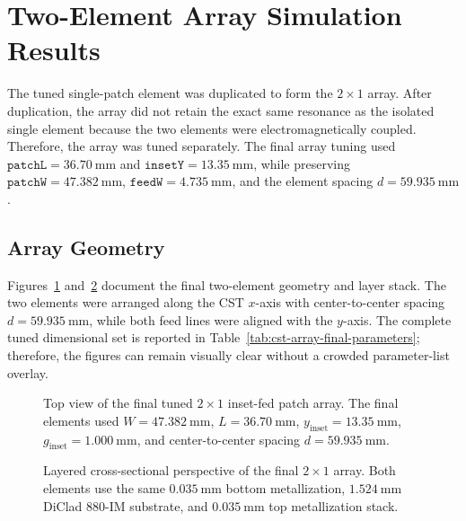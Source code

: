 \section{Two-Element Array Simulation Results}
\label{sec:array-results}

The tuned single-patch element was duplicated to form the \(2\times1\) array.  After duplication, the
array did not retain the exact same resonance as the isolated single element because the two elements
were electromagnetically coupled.  Therefore, the array was tuned separately.  The final array tuning
used \(\texttt{patchL}=36.70~\mathrm{mm}\) and \(\texttt{insetY}=13.35~\mathrm{mm}\), while preserving
\(\texttt{patchW}=47.382~\mathrm{mm}\), \(\texttt{feedW}=4.735~\mathrm{mm}\), and the element spacing
\(d=59.935~\mathrm{mm}\).

\subsection{Array Geometry}
\label{subsec:array-geometry-results}

Figures~\ref{fig:array-top-view-dimensions} and~\ref{fig:array-cross-section-dimensions}
document the final two-element geometry and layer stack. The two elements were arranged along the
CST $x$-axis with center-to-center spacing $d=59.935~\mathrm{mm}$, while both feed lines were aligned
with the $y$-axis. The complete tuned dimensional set is reported in
Table~\ref{tab:cst-array-final-parameters}; therefore, the figures can remain visually clear without a
crowded parameter-list overlay.

\begin{figure}[H]
    \centering
    \caption[Top view of the final tuned $2\times1$ array.]{Top view of the final tuned $2\times1$ inset-fed patch array. The final elements used $W=47.382~\mathrm{mm}$, $L=36.70~\mathrm{mm}$, $y_{\mathrm{inset}}=13.35~\mathrm{mm}$, $g_{\mathrm{inset}}=1.000~\mathrm{mm}$, and center-to-center spacing $d=59.935~\mathrm{mm}$.}
    \label{fig:array-top-view-dimensions}
\end{figure}

\begin{figure}[H]
    \centering
    \caption[Layered cross-sectional view of the final $2\times1$ array.]{Layered cross-sectional perspective of the final $2\times1$ array. Both elements use the same $0.035~\mathrm{mm}$ bottom metallization, $1.524~\mathrm{mm}$ DiClad 880-IM substrate, and $0.035~\mathrm{mm}$ top metallization stack.}
    \label{fig:array-cross-section-dimensions}
\end{figure}

